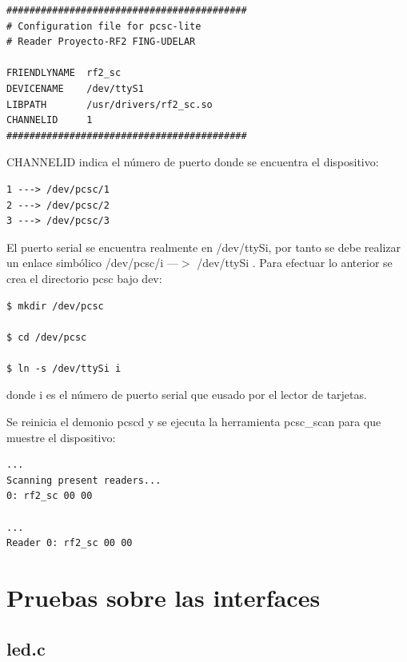 \begin{verbatim}
##########################################
# Configuration file for pcsc-lite 
# Reader Proyecto-RF2 FING-UDELAR 

FRIENDLYNAME  rf2_sc 
DEVICENAME    /dev/ttyS1 
LIBPATH       /usr/drivers/rf2_sc.so 
CHANNELID     1 
##########################################
\end{verbatim}

CHANNELID indica el número de puerto donde se encuentra el dispositivo: 

\begin{verbatim}
1 ---> /dev/pcsc/1 
2 ---> /dev/pcsc/2 
3 ---> /dev/pcsc/3 
\end{verbatim}

El puerto serial se encuentra realmente en /dev/ttySi, por tanto se debe realizar un enlace simbólico /dev/pcsc/i ---$>$ /dev/ttySi . Para efectuar lo anterior se crea el directorio pcsc bajo dev: 

\begin{verbatim}
$ mkdir /dev/pcsc

$ cd /dev/pcsc

$ ln -s /dev/ttySi i
\end{verbatim}

donde i es el número de puerto serial que eusado por el lector de tarjetas. 

\bigskip
Se reinicia el demonio pcscd y se ejecuta la herramienta pcsc\_scan para que muestre el dispositivo: 

\begin{verbatim}
...	
Scanning present readers... 
0: rf2_sc 00 00 

... 
Reader 0: rf2_sc 00 00 
\end{verbatim}


\section{Pruebas sobre las interfaces}

\subsection{led.c}\label{anx_sw_led}

